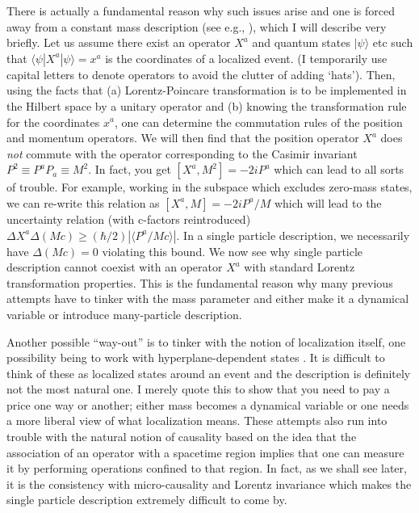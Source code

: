 \documentclass[12pt]{article}
\def\ket#1{|#1\rangle}                    %
\def\bk#1#2#3{{\langle #1|#2|#3\rangle}}  %
\begin{document}
There is actually a fundamental reason why such issues arise and one is forced away from a constant mass description (see e.g., \cite{fb}), which I will describe very briefly. Let us assume there exist an operator $X^a$ and quantum states $\ket{\psi}$ etc such that $\bk{\psi}{X^a}{\psi}=x^a$ is the coordinates of a localized event. (I temporarily use capital letters to denote operators to avoid the clutter of adding `hats'). Then, using the facts that (a) Lorentz-Poincare transformation is to be implemented in the Hilbert space by a unitary operator and (b) knowing the transformation rule for the coordinates $x^a$, one can determine the commutation rules of the position and momentum operators. We will then find that the position operator $X^a$ does \textit{not} commute with the operator corresponding to the Casimir invariant $P^2\equiv P^aP_a\equiv M^2$. In fact, you get $[X^a,M^2]=-2iP^a$ which can lead to all sorts of trouble. For example, working in the subspace which excludes zero-mass states, we can re-write this relation as $[X^a,M]=-2iP^a/M$ which will lead to the uncertainty relation (with c-factors reintroduced)
$\Delta X^a \Delta (Mc)\geq (\hbar/2)|\langle P^a/Mc\rangle|$. In a single particle description, we necessarily have $\Delta (Mc)=0$ violating this bound. We now see why single particle description cannot coexist with an operator $X^a$ with standard Lorentz transformation properties. This is the fundamental reason why many previous attempts have to tinker with the mass parameter and either make it a dynamical variable or introduce many-particle description.

Another possible ``way-out'' is to tinker with the notion of localization itself, one possibility being to work with hyperplane-dependent states \cite{fb}. It is difficult to think of these as localized states around an event and the description is definitely not the most natural one. I merely quote this to show that you need to pay a price one way or another; either mass becomes a dynamical variable or one needs a more liberal view of what localization means. These attempts also run into trouble \cite{malament} with the natural notion of causality based on the idea that 
the association of an
operator with a spacetime region implies that one can measure it by
performing operations confined to that region. In fact, as we shall see later, it is the consistency with micro-causality and Lorentz invariance which makes the single particle description extremely difficult to come by.
\end{document}
